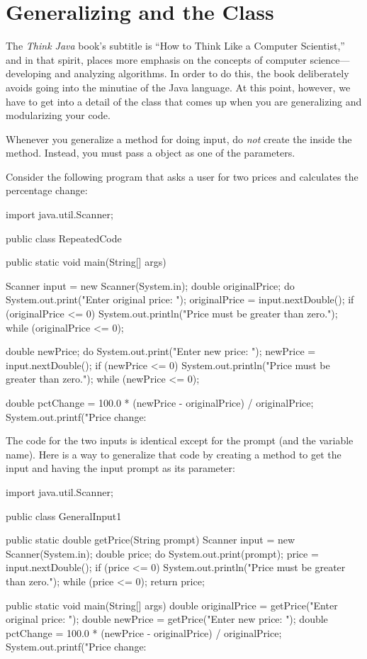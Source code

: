 \section{Generalizing and the  Class}

The {\em Think Java} book's subtitle is ``How to Think Like a Computer Scientist,'' and in that spirit, places more emphasis on the concepts of computer science---developing and analyzing algorithms. In order to do this, the book deliberately avoids going into the minutiae of the Java language. At this point, however, we have to get into a detail of the  class that comes up when you are generalizing and modularizing your code.

Whenever you generalize a method for doing input, do {\em not} create the  inside the method. Instead, you must pass a  object as one of the parameters.

Consider the following program that asks a user for two prices and calculates the percentage change:

\begin{code}
import java.util.Scanner;

public class RepeatedCode {
  public static void main(String[] args) {
    Scanner input = new Scanner(System.in);
    double originalPrice;
    do {
      System.out.print("Enter original price: ");
      originalPrice = input.nextDouble();
      if (originalPrice <= 0) {
        System.out.println("Price must be greater than zero.");
      }
    } while (originalPrice <= 0);
    
    double newPrice;
    do {
      System.out.print("Enter new price: ");
      newPrice = input.nextDouble();
      if (newPrice <= 0) {
        System.out.println("Price must be greater than zero.");
      }
    } while (newPrice <= 0);
    
    double pctChange = 100.0 *
      (newPrice - originalPrice) / originalPrice;
    System.out.printf("Price change: %
  }
}
\end{code}

The code for the two inputs is identical except for the prompt (and the variable name). Here is a way to generalize that code by creating a method to get the input and having the input prompt as its parameter:

\begin{code}
import java.util.Scanner;

public class GeneralInput1 {
  
  public static double getPrice(String prompt) {
    Scanner input = new Scanner(System.in);
    double price;
    do {
      System.out.print(prompt);
      price = input.nextDouble();
      if (price <= 0) {
        System.out.println("Price must be greater than zero.");
      }
    } while (price <= 0);
    return price;
  }

    
  public static void main(String[] args) {
    double originalPrice = getPrice("Enter original price: ");
    double newPrice = getPrice("Enter new price: ");
    double pctChange = 100.0 *
      (newPrice - originalPrice) / originalPrice;
    System.out.printf("Price change: %
  }
}
\end{code}

